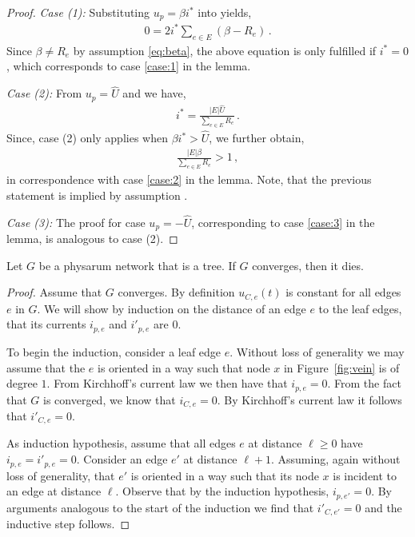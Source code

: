 \begin{proof}
\medskip

\noindent
{\em Case (1):} Substituting $u_p = \beta i^*$ into  yields,
\begin{align}
0 = 2 i^*\sum_{e \in E} (\beta - R_e)\,.
\end{align}
Since $\beta \neq R_e$ by assumption \eqref{eq:beta}, the above equation is
  only fulfilled if $i^* = 0$, which corresponds to case \ref{case:1} in the lemma. 

\medskip
  
\noindent
{\em Case (2):} From $u_p = \hat{U}$ and  we have,
\begin{align}
i^* = \frac{|E|\hat{U}}{\sum_{e \in E} R_e}\,.
\end{align}
Since, case (2) only applies when $\beta i^* > \hat{U}$, we further obtain,
\begin{align}
\frac{|E|\beta}{\sum_{e \in E} R_e} > 1\,,
\end{align}
in correspondence with case \ref{case:2} in the lemma. Note, that the previous statement is implied by assumption .

\medskip

\noindent
{\em Case (3):} The proof for case $u_p = -\hat{U}$, corresponding to case \ref{case:3} in the lemma, is analogous
  to case (2). 

\end{proof}


\begin{lem}\label{lem:tree_cont}
Let $G$ be a physarum network that is a tree.
If $G$ converges, then it dies.
\end{lem}
\begin{proof}
Assume that $G$ converges.
By definition $u_{C,e}(t)$ is constant for all edges $e$ in $G$. 
We will show by induction on the distance of an edge $e$ to the leaf edges,
  that its currents $i_{p,e}$ and $i'_{p,e}$ are $0$.

To begin the induction, consider a leaf edge $e$.
Without loss of generality we may assume that the $e$ is oriented in a way such that node $x$ in Figure~\ref{fig:vein} is of degree $1$. From Kirchhoff's current law we then have that $i_{p,e} = 0$. From the fact that $G$ is converged, we know that $i_{C,e} = 0$. By Kirchhoff's current law it follows that $i'_{C,e} = 0$.

As induction hypothesis, assume that all edges $e$ at distance $\ell \ge 0$ have $i_{p,e} = i'_{p,e} = 0$.
Consider an edge $e'$ at distance $\ell+1$. Assuming, again without loss of generality, that $e'$ is oriented in a way such that its node $x$ is incident to an edge at distance $\ell$. Observe that by the induction hypothesis, $i_{p,e'} = 0$. By arguments analogous to the start of the induction we find that $i'_{C,e'} = 0$ and the inductive step follows.  
\end{proof}
  
